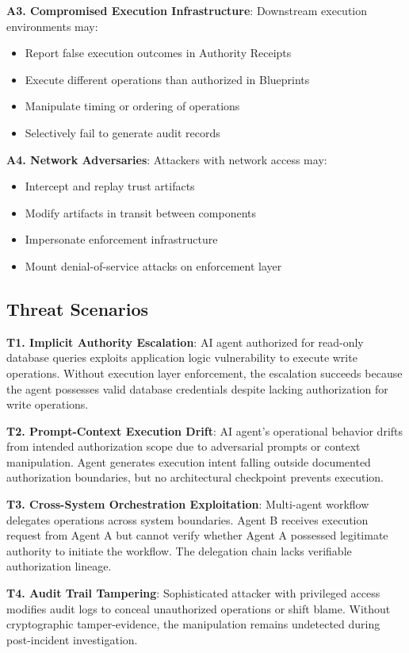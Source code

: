 \documentclass[11pt,letterpaper]{article}
\begin{document}
\textbf{A3. Compromised Execution Infrastructure}: Downstream execution environments may:
\begin{itemize}
\item Report false execution outcomes in Authority Receipts
\item Execute different operations than authorized in Blueprints
\item Manipulate timing or ordering of operations
\item Selectively fail to generate audit records
\end{itemize}

\textbf{A4. Network Adversaries}: Attackers with network access may:
\begin{itemize}
\item Intercept and replay trust artifacts
\item Modify artifacts in transit between components
\item Impersonate enforcement infrastructure
\item Mount denial-of-service attacks on enforcement layer
\end{itemize}

\subsection{Threat Scenarios}

\textbf{T1. Implicit Authority Escalation}: AI agent authorized for read-only database queries exploits application logic vulnerability to execute write operations. Without execution layer enforcement, the escalation succeeds because the agent possesses valid database credentials despite lacking authorization for write operations.

\textbf{T2. Prompt-Context Execution Drift}: AI agent's operational behavior drifts from intended authorization scope due to adversarial prompts or context manipulation. Agent generates execution intent falling outside documented authorization boundaries, but no architectural checkpoint prevents execution.

\textbf{T3. Cross-System Orchestration Exploitation}: Multi-agent workflow delegates operations across system boundaries. Agent B receives execution request from Agent A but cannot verify whether Agent A possessed legitimate authority to initiate the workflow. The delegation chain lacks verifiable authorization lineage.

\textbf{T4. Audit Trail Tampering}: Sophisticated attacker with privileged access modifies audit logs to conceal unauthorized operations or shift blame. Without cryptographic tamper-evidence, the manipulation remains undetected during post-incident investigation.
\end{document}
